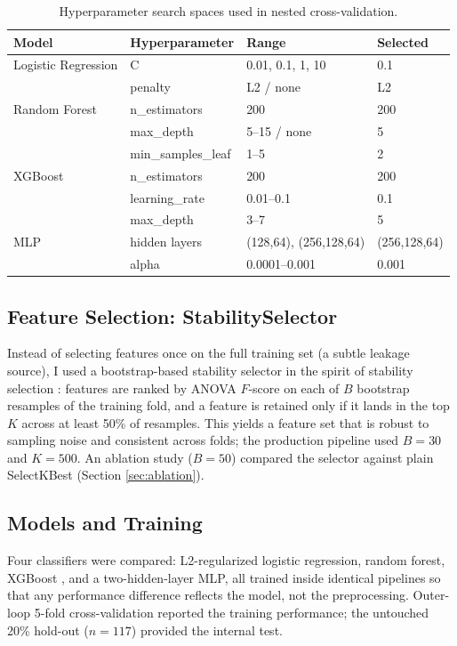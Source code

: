 \documentclass[12pt]{article}
\begin{document}
\begin{table}[htbp]
\centering
\caption{Hyperparameter search spaces used in nested cross-validation.}
\label{tab:hyper}
\begin{tabular}{llll}
\toprule
\textbf{Model} & \textbf{Hyperparameter} & \textbf{Range} & \textbf{Selected} \\
\midrule
Logistic Regression & C & {0.01, 0.1, 1, 10} & 0.1 \\
 & penalty & L2 / none & L2 \\
Random Forest & n\_estimators & 200 & 200 \\
 & max\_depth & 5--15 / none & 5 \\
 & min\_samples\_leaf & 1--5 & 2 \\
XGBoost \citep{chen2016} & n\_estimators & 200 & 200 \\
 & learning\_rate & 0.01--0.1 & 0.1 \\
 & max\_depth & 3--7 & 5 \\
MLP & hidden layers & (128,64), (256,128,64) & (256,128,64) \\
 & alpha & 0.0001--0.001 & 0.001 \\
\bottomrule
\end{tabular}
\end{table}

\subsection{Feature Selection: StabilitySelector}
Instead of selecting features once on the full training set (a subtle leakage source), I used a bootstrap-based stability selector in the spirit of stability selection \citep{meinshausen2010}: features are ranked by ANOVA $F$-score on each of $B$ bootstrap resamples of the training fold, and a feature is retained only if it lands in the top $K$ across at least 50\% of resamples. This yields a feature set that is robust to sampling noise and consistent across folds; the production pipeline used $B = 30$ and $K = 500$. An ablation study ($B = 50$) compared the selector against plain SelectKBest (Section \ref{sec:ablation}).

\subsection{Models and Training}
Four classifiers were compared: L2-regularized logistic regression, random forest, XGBoost \citep{chen2016}, and a two-hidden-layer MLP, all trained inside identical pipelines so that any performance difference reflects the model, not the preprocessing. Outer-loop 5-fold cross-validation reported the training performance; the untouched 20\% hold-out ($n = 117$) provided the internal test.
\end{document}

